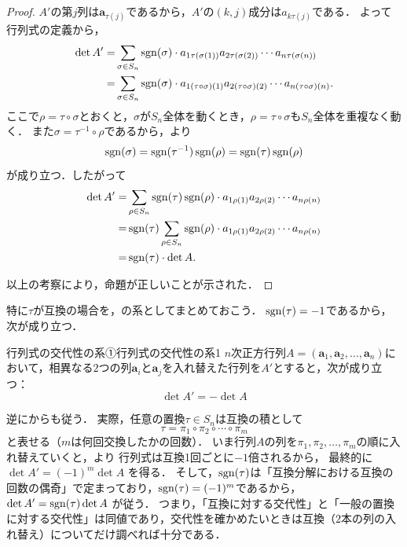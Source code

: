\begin{tleftbar}
  \begin{proof}
    $A'$の第$j$列は$\bm{a}_{\tau(j)}$であるから，$A'$の$(k, j)$成分は$a_{k\tau(j)}$である．
    よって行列式の定義から，
    \begin{align*} 
      \det A ' = & \sum_{\sigma \in S_n} \sgn(\sigma) \cdot a_{1\tau(\sigma(1))} a_{2\tau(\sigma(2))} \dotsm a_{n\tau(\sigma(n))} \\
      = & \sum_{\sigma \in S_n} \sgn(\sigma) \cdot a_{1(\tau \circ \sigma)(1)} a_{2(\tau \circ \sigma)(2)} \dotsm a_{n(\tau \circ \sigma)(n)}.
    \end{align*} 
    ここで$\rho = \tau \circ \sigma$とおくと，$\sigma$が$S_n$全体を動くとき，$\rho = \tau \circ \sigma$も$S_n$全体を重複なく動く．
    また$\sigma = \tau^{-1} \circ \rho$であるから，より
    \[
      \operatorname{sgn}(\sigma) = \operatorname{sgn}(\tau^{-1}) \operatorname{sgn}(\rho) = \operatorname{sgn}(\tau) \operatorname{sgn}(\rho)
    \]
    が成り立つ．したがって
    \begin{align*} 
      \det A ' = & \sum_{\rho \in S_n} \sgn(\tau) \sgn(\rho) \cdot a_{1\rho(1)} a_{2\rho(2)} \dotsm a_{n\rho(n)} \\
      = & \sgn (\tau) \sum_{\rho \in S_n} \sgn(\rho) \cdot a_{1\rho(1)} a_{2\rho(2)} \dotsm a_{n\rho(n)} \\
      = & \sgn (\tau) \cdot \det A.
    \end{align*}

    以上の考察により，命題が正しいことが示された．
  \end{proof}
  \end{tleftbar}

  特に$\tau$が互換の場合を，の系としてまとめておこう．
  $\operatorname{sgn}(\tau) = -1$であるから，次が成り立つ．

  \begin{cor}{行列式の交代性の系①}{行列式の交代性の系1}
    $n$次正方行列$A = (\bm{a}_1, \bm{a}_2, \dots, \bm{a}_n)$において，相異なる$2$つの列$\bm{a}_i$と$\bm{a}_j$を入れ替えた行列を$A'$とすると，次が成り立つ：
    \[
    \det A' = - \det A
    \]
  \end{cor}

  逆にからも従う．
  実際，任意の置換$\tau\in S_n$は互換の積として
  \[
  \tau=\pi_1\circ\pi_2\circ\cdots\circ\pi_m
  \]
  と表せる（$m$は何回交換したかの回数）．
  いま行列$A$の列を$\pi_1,\pi_2,\dots,\pi_m$の順に入れ替えていくと，より
  行列式は互換1回ごとに$-1$倍されるから，
  最終的に $\det A' = (-1)^m \det A$ を得る．
  そして，$\operatorname{sgn}(\tau)$は「互換分解における互換の回数の偶奇」で定まっており，$\operatorname{sgn}(\tau)=(-1)^m$であるから，
  $\det A'=\operatorname{sgn}(\tau)\det A$ が従う．
  つまり，「互換に対する交代性」と「一般の置換に対する交代性」は同値であり，交代性を確かめたいときは互換（$2$本の列の入れ替え）についてだけ調べれば十分である．

